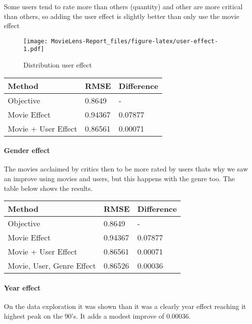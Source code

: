 \documentclass[
]{article}
\begin{document}
Some users tend to rate more than others (quantity) and other are more
critical than others, so adding the user effect is slightly better than
only use the movie effect

\begin{figure}
\centering
\texttt{[image: MovieLens-Report\_files/figure-latex/user-effect-1.pdf]}
\caption{Distribution user effect}
\end{figure}

\begin{longtable}[]{@{}lll@{}}
\toprule\noalign{}
Method & RMSE & Difference \\
\midrule\noalign{}
\endhead
\bottomrule\noalign{}
\endlastfoot
Objective & 0.8649 & - \\
Movie Effect & 0.94367 & 0.07877 \\
Movie + User Effect & 0.86561 & 0.00071 \\
\end{longtable}

\hypertarget{gender-effect}{%
\paragraph{Gender effect}\label{gender-effect}}

The movies acclaimed by critics then to be more rated by users thats why
we saw an improve using movies and users, but this happens with the
genre too. The table below shows the results.

\begin{longtable}[]{@{}lll@{}}
\toprule\noalign{}
Method & RMSE & Difference \\
\midrule\noalign{}
\endhead
\bottomrule\noalign{}
\endlastfoot
Objective & 0.8649 & - \\
Movie Effect & 0.94367 & 0.07877 \\
Movie + User Effect & 0.86561 & 0.00071 \\
Movie, User, Genre Effect & 0.86526 & 0.00036 \\
\end{longtable}

\hypertarget{year-effect}{%
\paragraph{Year effect}\label{year-effect}}

On the data exploration it was shown than it was a clearly year effect
reaching it highest peak on the 90's. It adds a modest improve of
0.00036.
\end{document}

